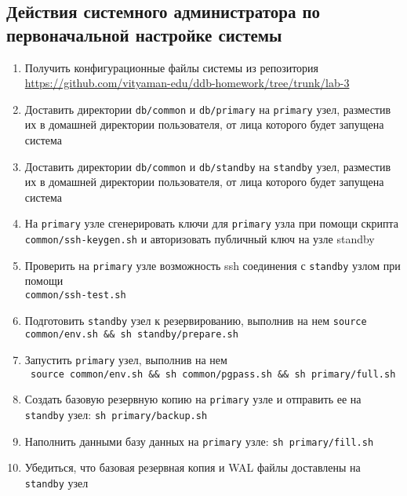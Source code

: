 \documentclass{article}
\begin{document}
\subsection{Действия системного администратора по первоначальной настройке системы}

\begin{enumerate}
    \item Получить конфигурационные файлы системы из репозитория \\
    \url{https://github.com/vityaman-edu/ddb-homework/tree/trunk/lab-3}

    \item Доставить директории \texttt{db/common} и \texttt{db/primary} на \texttt{primary} узел, разместив их в домашней директории пользователя, от лица которого будет запущена система
    
    \item Доставить директории \texttt{db/common} и \texttt{db/standby} на \texttt{standby} узел, разместив их в домашней директории пользователя, от лица которого будет запущена система
    
    \item На \texttt{primary} узле сгенерировать ключи для \texttt{primary} узла при помощи скрипта \\ \texttt{common/ssh-keygen.sh} и авторизовать публичный ключ на узле standby 
    
    \item Проверить на \texttt{primary} узле возможность ssh соединения с \texttt{standby} узлом при помощи \\ \texttt{common/ssh-test.sh}
    
    \item Подготовить \texttt{standby} узел к резервированию, выполнив на нем \texttt{source common/env.sh \&\& sh standby/prepare.sh}
    
    \item Запустить \texttt{primary} узел, выполнив на нем \\
    \texttt{
        source common/env.sh \&\& 
        sh common/pgpass.sh \&\& 
        sh primary/full.sh}

    \item Создать базовую резервную копию на \texttt{primary} узле и отправить ее на \texttt{standby} узел: \texttt{sh primary/backup.sh}
    
    \item Наполнить данными базу данных на \texttt{primary} узле:
    \texttt{sh primary/fill.sh}

    \item Убедиться, что базовая резервная копия и WAL файлы доставлены на \texttt{standby} узел

\end{enumerate}
\end{document}
